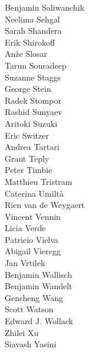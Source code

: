 \documentclass[PICOAPC.tex]{subfiles}
\begin{document}
{\begin{multicols}{4}
Benjamin Saliwanchik            \\
Neelima Sehgal                  \\
Sarah Shandera                  \\
Erik Shirokoff                  \\
An\v{z}e Slosar                 \\
Tarun Souradeep                 \\
Suzanne Staggs                  \\
George Stein                    \\
Radek Stompor                   \\
Rashid Sunyaev                  \\
Aritoki Suzuki                  \\
Eric Switzer                    \\
Andrea Tartari                  \\
Grant Teply                     \\
Peter Timbie                    \\
Matthieu Tristram               \\
Caterina Umilt\`{a}             \\
Rien van de Weygaert            \\
Vincent Vennin                  \\
Licia Verde                     \\
Patricio Vielva                 \\
Abigail Vieregg                 \\
Jan Vrtilek                     \\
Benjamin Wallisch               \\
Benjamin Wandelt                \\
Gensheng Wang                   \\
Scott Watson                    \\
Edward J. Wollack               \\
Zhilei Xu                       \\
Siavash Yasini
\end{multicols}
}

\vskip -7pt
\end{document}
